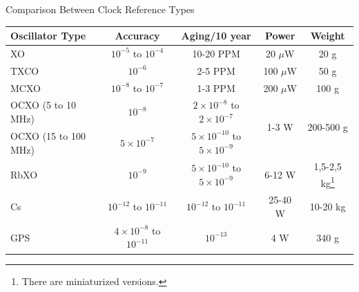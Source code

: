 \begin{frame}{Comparison Between Clock Reference Types}

    \begin{table}[!ht]\tiny
        \centering
        \begin{tabular}{lcccc}
            \toprule[1.5pt]
            \textbf{Oscillator Type} & \textbf{Accuracy} & \textbf{Aging/10 year} & \textbf{Power} & \textbf{Weight} \\
            \midrule
            XO                   & $10^{-5}$ to $10^{-4}$   & 10-20 PPM                                 & 20 $\mu$W  & 20 g \\
            TXCO                 & $10^{-6}$                & 2-5 PPM                                   & 100 $\mu$W & 50 g \\
            MCXO                 & $10^{-8}$ to $10^{-7}$   & 1-3 PPM                                   & 200 $\mu$W & 100 g \\
            OCXO (5 to 10 MHz)   & $10^{-8}$                & $2 \times 10^{-8}$ to $2 \times 10^{-7}$  & \multirow{2}{*}{1-3 W} & \multirow{2}{*}{200-500 g} \\
            OCXO (15 to 100 MHz) & $5 \times 10^{-7}$       & $5 \times 10^{-10}$ to $5 \times 10^{-9}$ &            &  \\
            RbXO                 & $10^{-9}$                & $5 \times 10^{-10}$ to $5 \times 10^{-9}$ & 6-12 W & 1,5-2,5 kg\footnote{There are miniaturized versions.} \\
            Cs                   & $10^{-12}$ to $10^{-11}$ & $10^{-12}$ to $10^{-11}$                  & 25-40 W & 10-20 kg \\
            GPS                  & $4 \times 10^{-8}$ to $10^{-11}$ & $10^{-13}$ & 4 W & 340 g \\
            \bottomrule[1.5pt]
        \end{tabular}
        \label{tab:osc-comp}
    \end{table}

\end{frame}

